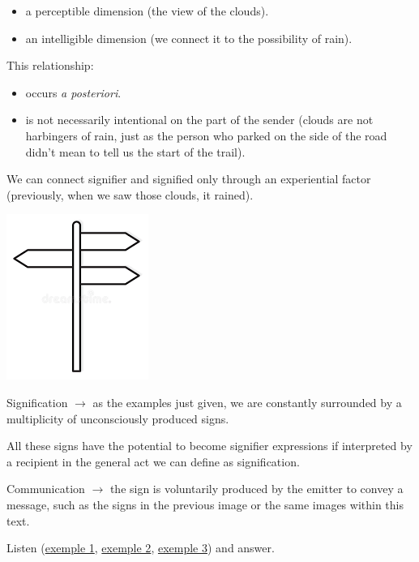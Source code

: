 \begin{itemize}
\tightlist
\item a perceptible dimension (the view of the clouds). 
\item  an intelligible dimension (we connect it to the possibility of rain).
\end{itemize}

This relationship: 

\begin{itemize}
\tightlist
\item occurs \textit{a posteriori}.
\item is not necessarily intentional on the part of the sender (clouds are not harbingers of rain, just as the person who parked on the side of the road didn't mean to tell us the start of the trail).
\end{itemize}
We can connect signifier and signified only through an experiential factor (previously, when we saw those clouds, it rained).

\begin{center}
\includegraphics[scale=0.4]{../img/cartello.png}
\end{center}

Signification \(\rightarrow\) as the examples just given, we are constantly surrounded by a multiplicity of unconsciously produced signs.

All these signs have the potential to become signifier expressions if interpreted by a recipient in the general act we can define as signification.

Communication \(\rightarrow\) the sign is voluntarily produced by the emitter to convey a message, such as the signs in the previous image or the same images within this text.

Listen (\href{http://www.musicaecodice.it/gitmedia/emc/1_media/annuncio.mp3}{exemple 1}, \href{http://www.musicaecodice.it/gitmedia/emc/1_media/pubbli.mp3}{exemple 2}, \href{http://www.musicaecodice.it/gitmedia/emc/1_media/ligeti.mp3}{exemple 3}) and answer.


